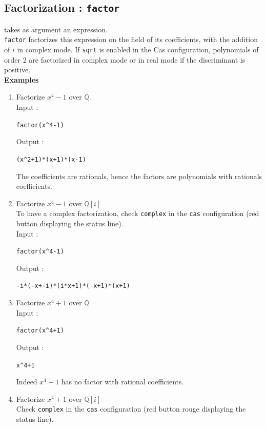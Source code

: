 \documentclass[a4paper,11pt]{book}
\begin{document}
\subsection{Factorization : {\tt factor}}\label{sec:factore}
 takes as argument an expression.\\
{\tt factor} factorizes this expression on the field of its coefficients,
with the addition of $i$ in complex mode. If {\tt sqrt} is enabled
in the Cas configuration, polynomials of order 2 are factorized in
complex mode or in real mode if the discriminant is positive.\\
{\bf Examples}
\begin{enumerate}
\item Factorize $x^4-1$ over $\mathbb Q$.\\
Input :
\begin{center}{\tt factor(x\verb|^|4-1)}\end{center}
Output :
\begin{center}{\tt (x\verb|^|2+1)*(x+1)*(x-1)}\end{center}
The coefficients are rationals, hence the factors are polynomials with
rationals coefficients.\\
\item Factorize $x^4-1$ over $\mathbb Q[i]$ \\
To have a complex factorization, check {\tt complex} in the {\tt cas}
configuration (red button displaying the status line).\\
Input :
\begin{center}{\tt factor(x\verb|^|4-1)}\end{center}
Output :
\begin{center}{\tt -i*(-x+-i)*(i*x+1)*(-x+1)*(x+1)}\end{center}
\item  Factorize $x^4+1$ over $\mathbb Q$\\
Input :
\begin{center}{\tt factor(x\verb|^|4+1)}\end{center}
Output :
\begin{center}{\tt x\verb|^|4+1}\end{center}
Indeed $ x^4+1$ has no factor with rational coefficients.\\
\item  Factorize  $x^4+1$ over $\mathbb Q[i]$\\
Check {\tt complex} in the {\tt cas}
configuration (red button rouge displaying the status line).\\

\end{enumerate}
\end{document}

